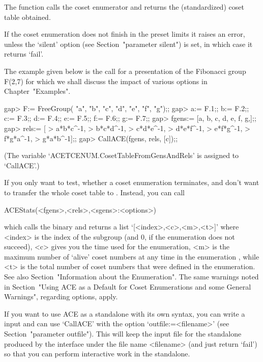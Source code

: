 The  function   calls the  {\ACE}  coset  enumerator  and returns  the
(standardized) coset table obtained.

If the coset enumeration does not finish in the preset limits it raises
an error, unless the  `silent' option (see Section~"parameter silent") 
is set, in which case it  returns  `fail'.  

The  example  given  below is  the  call  for  a presentation  of  the
Fibonacci  group F(2,7)  for  which  we shall  discuss  the impact  of
various options in Chapter~"Examples".

\begintt
gap> F:= FreeGroup( "a", "b", "c", "d", "e", "f", "g");;
gap> a:= F.1;; b:= F.2;; c:= F.3;; d:= F.4;; e:= F.5;; f:= F.6;; g:= F.7;;
gap> fgens:= [a, b, c, d, e, f, g,];;
gap> rels:= [
> a*b*c^-1,
> b*c*d^-1,
> c*d*e^-1,
> d*e*f^-1,
> e*f*g^-1,
> f*g*a^-1,
> g*a*b^-1];;
gap> CallACE(fgens, rels, [c]);;
\endtt

(The  variable  `ACETCENUM.CosetTableFromGensAndRels'  is assigned  to
`CallACE'.)

If you only want to  test, whether a coset enumeration terminates, and
don't want to  transfer the whole coset table  to {\GAP}. Instead, you
can call

\>ACEStats(<fgens>,<rels>,<sgens>:<options>)

which    calls    the   {\ACE}    binary    and    returns   a    list
`[<index>,<c>,<m>,<t>]'  where <index>  is the  index of  the subgroup
(and $0$, if the enumeration does not succeed), <c> gives you the time
used for the enumeration, <m> is the maximum number of \lq alive' coset
numbers at any time in the enumeration , while <t> is the total number
of  coset numbers  that  were  defined in  the  enumeration. See  also
Section~"Information about the Enumeration".   The same warnings noted
in     Section~"Using ACE as a Default for Coset Enumerations and some 
General Warnings", regarding options, apply.


If you want  to use ACE as  a standalone with its own  syntax, you can
write  a  {\GAP}   input  and  can  use  `CallACE'   with  the  option
`outfile:=<filename>' (see Section~"parameter  outfile").  This   will
keep the input file for the {\ACE}  standalone produced by the  {\GAP}
interface under the file name <filename> (and  just return `fail')  so
that you can perform  interactive work in the standalone.

